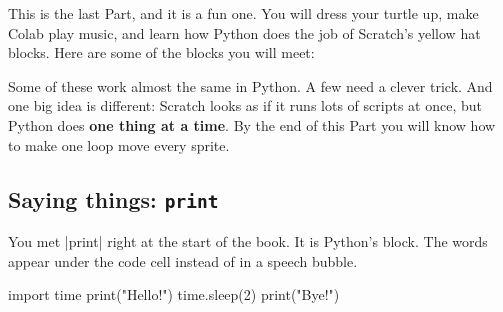 
This is the last Part, and it is a fun one. You will dress your turtle up, make Colab play music, and learn how Python does the job of Scratch's yellow hat blocks. Here are some of the blocks you will meet:

\begin{center}
\quad
{}\quad
{}\quad
{}\par\vspace{6pt}
\quad
{}\par\vspace{6pt}
\quad
{}\quad
{}
\end{center}

Some of these work almost the same in Python. A few need a clever trick. And one big idea is different: Scratch looks as if it runs lots of scripts at once, but Python does \textbf{one thing at a time}. By the end of this Part you will know how to make one loop move every sprite.

\subsection*{Saying things: \texttt{print}}

You met \py|print| right at the start of the book. It is Python's  block. The words appear under the code cell instead of in a speech bubble.

\begin{tcbraster}[raster columns=2, raster equal height=rows, raster column skip=12pt, raster valign=center]
\begin{tcolorbox}[colback=white, colframe=white, boxrule=0pt, valign=center]
\begin{scratch}
\end{scratch}
\end{tcolorbox}
\begin{code}
import time
print("Hello!")
time.sleep(2)
print("Bye!")
\end{code}
\end{tcbraster}

